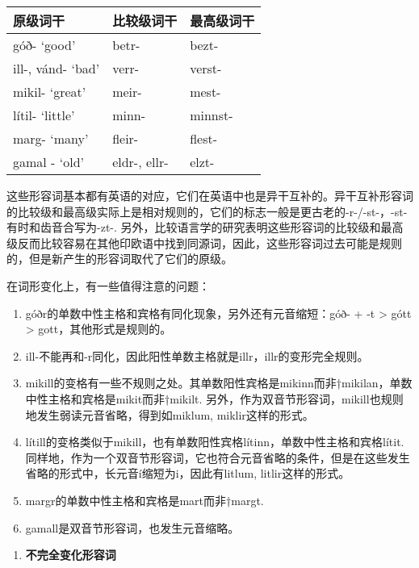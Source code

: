 \begin{longtable}{lll}
  \toprule
  原级词干              & 比较级词干        & 最高级词干   \\
  \midrule
  \endhead
  \bottomrule
  \endfoot
  góð- `good‌'       & betr-        & bezt-   \\
  ill-, vánd- `bad‌' & verr-        & verst-  \\
  mikil- `great‌'    & meir-        & mest-   \\
  lítil- `little‌'   & minn-        & minnst- \\
  marg- `many‌'      & fleir-       & flest-  \\
  gamal - `old‌'     & eldr-, ellr- & elzt-   \\
\end{longtable}

这些形容词基本都有英语的对应，它们在英语中也是异干互补的。异干互补形容词的比较级和最高级实际上是相对规则的，它们的标志一般是更古老的-r-/-st-，-st-有时和齿音合写为-zt-.
另外，比较语言学的研究表明这些形容词的比较级和最高级反而比较容易在其他印欧语中找到同源词，因此，这些形容词过去可能是规则的，但是新产生的形容词取代了它们的原级。

在词形变化上，有一些值得注意的问题：

\begin{enumerate}
  \def\labelenumi{\alph{enumi})}
  \item
        góðr的单数中性主格和宾格有同化现象，另外还有元音缩短：góð- + -t
        \textgreater{} gótt \textgreater{} gott，其他形式是规则的。
  \item
        ill-不能再和-r同化，因此阳性单数主格就是illr，illr的变形完全规则。
  \item
        mikill的变格有一些不规则之处。其单数阳性宾格是mikinn而非†mikilan，单数中性主格和宾格是mikit而非†mikilt.
        另外，作为双音节形容词，mikill也规则地发生弱读元音省略，得到如miklum,
        miklir这样的形式。
  \item
        lítill的变格类似于mikill，也有单数阳性宾格lítinn，单数中性主格和宾格lítit.
        同样地，作为一个双音节形容词，它也符合元音省略的条件，但是在这些发生省略的形式中，长元音í缩短为i，因此有litlum,
        litlir这样的形式。
  \item
        margr的单数中性主格和宾格是mart而非†margt.
  \item
        gamall是双音节形容词，也发生元音缩略。
\end{enumerate}

\begin{enumerate}
  \def\labelenumi{\arabic{enumi})}
  \setcounter{enumi}{2}
  \item
        \textbf{不完全变化形容词}
\end{enumerate}

